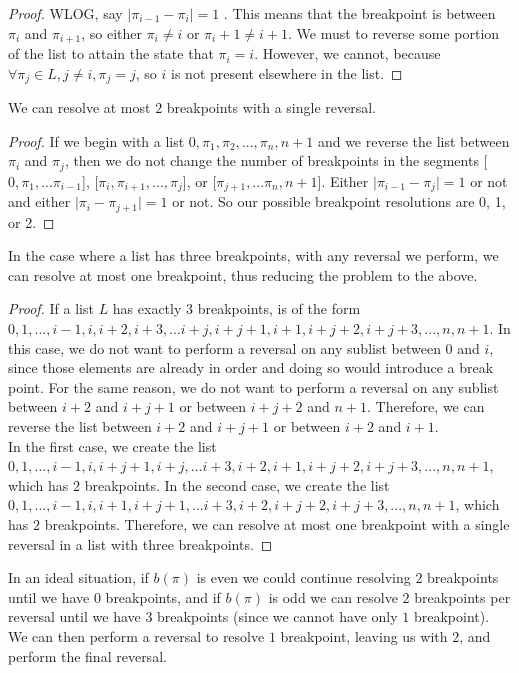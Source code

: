 \documentclass[a4paper]{article}
\begin{document}
\begin{enumerate}
\begin{enumerate}
\begin{proof}
	WLOG, say $\lvert \pi_{i-1} - \pi_i \rvert = 1$ .  This means that the breakpoint is between $\pi_i$ and $\pi_{i+1}$, so either $\pi_i \neq i$ or $\pi_i+1 \neq i+1$.  We must to reverse some portion of the list to attain the state that $\pi_i = i$.  However, we cannot, because $\forall \pi_j \in L, j \neq i, \pi_j = j$, so $i$ is not present elsewhere in the list.
	\end{proof}
	We can resolve at most $2$ breakpoints with a single reversal.
	\begin{proof}
	If we begin with a list $0, \pi_1, \pi_2, ... , \pi_n, n+1$ and we reverse the list between $\pi_i$ and $\pi_j$, then we do not change the number of breakpoints in the segments [$0, \pi_1, ... \pi_{i-1}$], [$\pi_i, \pi_{i+1}, ... , \pi_j$], or [$\pi_{j+1}, ... \pi_n, n+1$].  Either $\rvert \pi_{i-1} - \pi_j \lvert = 1$ or not and either $\rvert \pi_i - \pi_{j+1} \lvert = 1$ or not.  So our possible breakpoint resolutions are 0, 1, or 2.
	\end{proof}
	In the case where a list has three breakpoints, with any reversal we perform, we can resolve at most one breakpoint, thus reducing the problem to the above.
	\begin{proof}
	If a list $L$ has exactly $3$ breakpoints, is of the form $0, 1, ...,i-1, i, i+2, i+3, ... i+j, i+j+1, i+1, i+j+2, i+j+3, ..., n, n+1$.  In this case, we do not want to perform a reversal on any sublist between $0$ and $i$, since those elements are already in order and doing so would introduce a break point.  For the same reason, we do not want to perform a reversal on any sublist between $i+2$ and $i+j+1$ or between $i+j+2$ and $n+1$.  Therefore, we can reverse the list between $i+2$ and $i+j+1$ or between $i+2$ and $i+1$.\\
	In the first case, we create the list $0, 1, ...,i-1, i, i+j+1, i+j, ... i+3, i+2, i+1, i+j+2, i+j+3, ..., n, n+1$, which has $2$ breakpoints.  In the second case, we create the list $0, 1, ...,i-1, i, i+1, i+j+1, ... i+3, i+2, i+j+2, i+j+3, ..., n, n+1$, which has $2$ breakpoints.  Therefore, we can resolve at most one breakpoint with a single reversal in a list with three breakpoints.
	\end{proof}
	In an ideal situation, if $b(\pi)$ is even we could continue resolving $2$ breakpoints until we have $0$ breakpoints, and if $b(\pi)$ is odd we can resolve $2$ breakpoints per reversal until we have $3$ breakpoints (since we cannot have only $1$ breakpoint).  We can then perform a reversal to resolve $1$ breakpoint, leaving us with $2$, and perform the final reversal.\\

\end{enumerate}
\end{enumerate}
\end{document}
